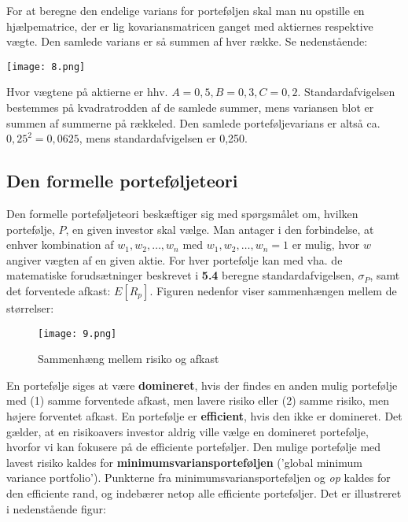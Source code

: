 \documentclass[10pt,reqno, usenames]{article}
\begin{document}
\begin{tcolorbox}[breakable, colback=red!5!white, colframe=red!50!black, title= Eksempel 7: Beregning af varians for en sammensat portefølje vha. kovarians- og hjælpematricer]
For at beregne den endelige varians for porteføljen skal man nu opstille en hjælpematrice, der er lig kovariansmatricen ganget med aktiernes respektive vægte. Den samlede varians er så summen af hver række. Se nedenstående: 

\vspace{10 pt}
\begin{center}
        \texttt{[image: 8.png]}
\end{center}

Hvor vægtene på aktierne er hhv. $A=0,5, B=0,3, C =0,2$. Standardafvigelsen bestemmes på kvadratrodden af de samlede summer, mens variansen blot er summen af summerne på rækkeled. Den samlede porteføljevarians er altså ca. $0,25^2 = 0,0625$, mens standardafvigelsen er 0,250. 
\end{tcolorbox}

\subsection{Den formelle porteføljeteori}
Den formelle porteføljeteori beskæftiger sig med spørgsmålet om, hvilken portefølje, $P$, en given investor skal vælge. Man antager i den forbindelse, at enhver kombination af $w_1, w_2, \ldots, w_n$ med $w_1, w_2, \ldots, w_n = 1$ er mulig, hvor $w$ angiver vægten af en given aktie. For hver portefølje kan med vha. de matematiske forudsætninger beskrevet i \textbf{5.4} beregne standardafvigelsen, $\sigma_P$, samt det forventede afkast: $E[R_p]$. Figuren nedenfor viser sammenhængen mellem de størrelser: 

\begin{figure}[h]
     \centering
     \texttt{[image: 9.png]}
     \caption{Sammenhæng mellem risiko og afkast}
     \label{Figur 2}
\end{figure} 

En portefølje siges at være \textbf{domineret}, hvis der findes en
anden mulig portefølje med (1) samme forventede afkast, men lavere risiko eller (2) samme risiko, men højere forventet afkast. En portefølje er \textbf{efficient}, hvis den ikke er domineret. Det gælder, at en risikoavers investor aldrig ville vælge en domineret portefølje, hvorfor vi kan fokusere på de efficiente porteføljer. Den mulige portefølje med lavest risiko kaldes for \textbf{minimumsvariansporteføljen} ('global minimum variance portfolio'). Punkterne fra minimumsvariansporteføljen og \textit{op} kaldes for den efficiente rand, og indebærer netop alle efficiente porteføljer. Det er illustreret i nedenstående figur: 
\end{document}
